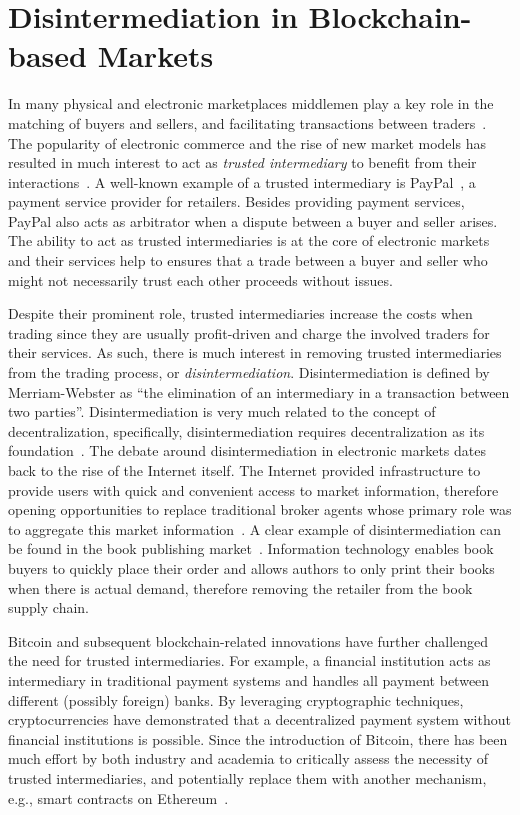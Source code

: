 \section{Disintermediation in Blockchain-based Markets}
In many physical and electronic marketplaces middlemen play a key role in the matching of buyers and sellers, and facilitating transactions between traders~\cite{bakos1998emerging}.
The popularity of electronic commerce and the rise of new market models has resulted in much interest to act as \emph{trusted intermediary} to benefit from their interactions~\cite{clark1999electronic}.
A well-known example of a trusted intermediary is PayPal~\cite{paypal}, a payment service provider for retailers.
Besides providing payment services, PayPal also acts as arbitrator when a dispute between a buyer and seller arises.
The ability to act as trusted intermediaries is at the core of electronic markets and their services help to ensures that a trade between a buyer and seller who might not necessarily trust each other proceeds without issues.

Despite their prominent role, trusted intermediaries increase the costs when trading since they are usually profit-driven and charge the involved traders for their services.
As such, there is much interest in removing trusted intermediaries from the trading process, or \emph{disintermediation}.
Disintermediation is defined by Merriam-Webster as \enquote{the elimination of an intermediary in a transaction between two parties}.
Disintermediation is very much related to the concept of decentralization, specifically, disintermediation requires decentralization as its foundation~\cite{guo2016blockchain}.
The debate around disintermediation in electronic markets dates back to the rise of the Internet itself. %
The Internet provided infrastructure to provide users with quick and convenient access to market information, therefore opening opportunities to replace traditional broker agents whose primary role was to aggregate this market information~\cite{wigand2020whatever}.
A clear example of disintermediation can be found in the book publishing market~\cite{giaglis1999disintermediation}.
Information technology enables book buyers to quickly place their order and allows authors to only print their books when there is actual demand, therefore removing the retailer from the book supply chain.

Bitcoin and subsequent blockchain-related innovations have further challenged the need for trusted intermediaries.
For example, a financial institution acts as intermediary in traditional payment systems and handles all payment between different (possibly foreign) banks.
By leveraging cryptographic techniques, cryptocurrencies have demonstrated that a decentralized payment system without financial institutions is possible.
Since the introduction of Bitcoin, there has been much effort by both industry and academia to critically assess the necessity of trusted intermediaries, and potentially replace them with another mechanism, e.g., smart contracts on Ethereum~\cite{lande2018sok}.

